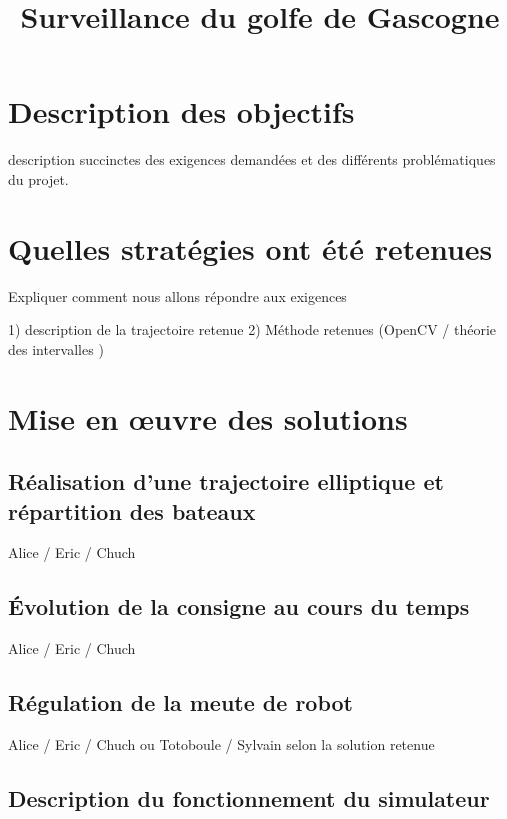 \documentclass[10pt,a4paper]{report}
\begin{document}
\title{\textbf{ {\Huge Surveillance du golfe de Gascogne}}}

\maketitle

\pagebreak

\chapter{Description des objectifs }

description succinctes des exigences demandées et des différents problématiques du projet.


\chapter{Quelles stratégies ont été retenues}

Expliquer comment nous allons répondre aux exigences

1) description de la trajectoire retenue
2) Méthode retenues (OpenCV / théorie des intervalles )


\chapter{Mise en œuvre des solutions}

\section{Réalisation d'une trajectoire elliptique et répartition des bateaux}

Alice / Eric / Chuch

\section{Évolution de la consigne au cours du temps}

Alice / Eric / Chuch

\section{Régulation de la meute de robot}

Alice / Eric / Chuch ou Totoboule / Sylvain selon la solution retenue

\section{Description du fonctionnement du simulateur}
\end{document}
